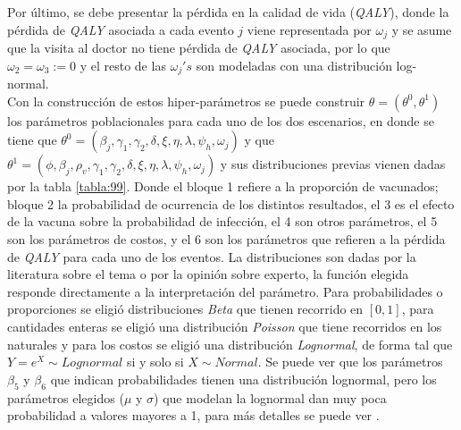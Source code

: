 \documentclass[12pt]{article}
\begin{document}
Por último, se debe presentar la pérdida en la calidad de vida (\textit{QALY}), donde la pérdida de \textit{QALY} asociada a cada evento $j$ viene representada por $\omega_j$ y se asume que la visita al doctor no tiene pérdida de \textit{QALY} asociada, por lo que $\omega_2=\omega_3:=0$ y el resto de las $\omega_j 's$ son modeladas con una distribución log-normal.\\

Con la construcción de estos hiper-parámetros se puede construir \textbf{$\theta=(\theta^0,\theta^1)$} los parámetros poblacionales para cada uno de los dos escenarios, en donde se tiene que $\theta^0=(\beta_j,\gamma_1,\gamma_2,\delta,\xi,\eta,\lambda,\psi_h,\omega_j)$ y que $\theta^1=(\phi,\beta_j,\rho_v,\gamma_1,\gamma_2,\delta,\xi,\eta,\lambda,\psi_h,\omega_j)$ y sus distribuciones previas vienen dadas por la tabla \ref{tabla:99}. Donde el bloque 1 refiere a la proporción de vacunados; bloque 2 la probabilidad de ocurrencia de los distintos resultados, el 3 es el efecto de la vacuna sobre la probabilidad de infección, el 4 son otros parámetros, el 5 son los parámetros de costos, y el 6 son los parámetros que refieren a la pérdida de \textit{QALY} para cada uno de los eventos. La distribuciones son dadas por la literatura sobre el tema o por la opinión sobre experto, la función elegida responde directamente a la interpretación del parámetro. Para probabilidades o proporciones se eligió distribuciones \textit{Beta} que tienen recorrido en $\left[0,1\right]$, para cantidades enteras se eligió una distribución \textit{Poisson} que tiene recorridos en los naturales y para los costos se eligió una distribución \textit{Lognormal}, de forma tal que $Y=e^X \sim Lognormal$ si y solo si $X\sim Normal$. Se puede ver que los parámetros $\beta_5$ y $\beta_6$ que indican probabilidades tienen una distribución lognormal, pero los parámetros elegidos ($\mu$ y $\sigma$) que modelan la lognormal dan muy poca probabilidad a valores mayores a 1, para más detalles se puede ver \cite{baio_bayesian_2017}.
\end{document}
